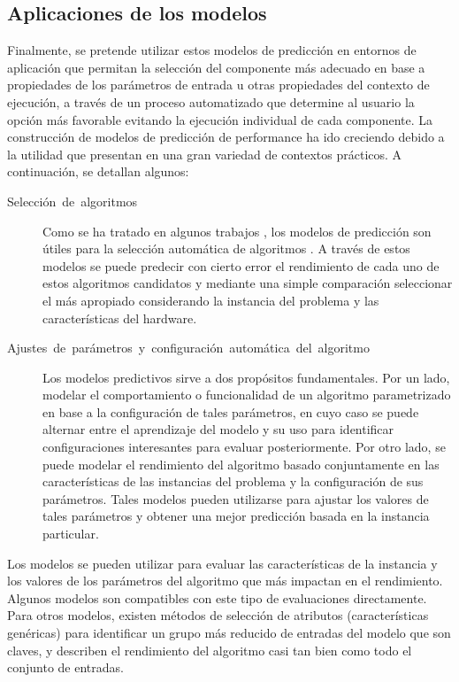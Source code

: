 \subsection*{Aplicaciones de los modelos\label{sec:Aplicaciones-de-la-1}}

Finalmente, se pretende utilizar estos modelos de predicción en entornos
de aplicación que permitan la selección del componente más adecuado
en base a propiedades de los parámetros de entrada u otras propiedades
del contexto de ejecución, a través de un proceso automatizado que
determine al usuario la opción más favorable evitando la ejecución
individual de cada componente.  La construcción de modelos de predicción
de performance ha ido creciendo debido a la utilidad que presentan
en una gran variedad de contextos prácticos. A continuación, se detallan
algunos:
\begin{description}
\item [{Selección~de~algoritmos}] Como se ha tratado en algunos trabajos
\citet{Hutter2014}, los modelos de predicción son útiles para la
selección automática de algoritmos . A través de estos modelos se
puede predecir con cierto error el rendimiento de cada uno de estos
algoritmos candidatos y mediante una simple comparación seleccionar
el más apropiado considerando la instancia del problema y las características
del hardware. 
\item [{Ajustes~de~parámetros~y~configuración~automática~del~algoritmo}] Los
modelos predictivos sirve a dos propósitos fundamentales. Por un lado,
modelar el comportamiento o funcionalidad de un algoritmo parametrizado
en base a la configuración de tales parámetros, en cuyo caso se puede
alternar entre el aprendizaje del modelo y su uso para identificar
configuraciones interesantes para evaluar posteriormente. Por otro
lado, se puede modelar el rendimiento del algoritmo basado conjuntamente
en las características de las instancias del problema y la configuración
de sus parámetros. Tales modelos pueden utilizarse para ajustar los
valores de tales parámetros y obtener una mejor predicción basada
en la instancia particular. 
\end{description}
\begin{mldescription} 
 Los modelos se pueden utilizar para evaluar las características de la instancia y los valores de los parámetros del algoritmo que más impactan en el rendimiento. Algunos modelos son compatibles con este tipo de evaluaciones directamente. Para otros modelos, existen métodos de selección de atributos (características genéricas) para identificar un grupo más reducido de entradas del modelo que son claves, y describen el rendimiento del algoritmo casi tan bien como todo el conjunto de entradas.
\end{mldescription} 
